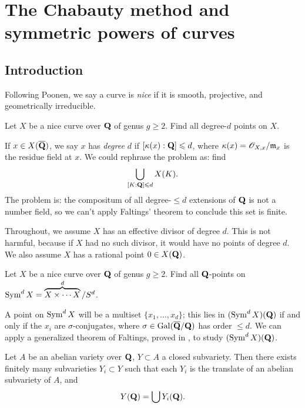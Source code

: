 
\section{The Chabauty method and symmetric powers of curves}\label{sec:park}





\subsection{Introduction}

Following Poonen, we say a curve is \emph{nice} if it is smooth, projective, 
and geometrically irreducible. 

\begin{question}
Let $X$ be a nice curve over $\mathbf{Q}$ of genus $g\geqslant 2$. Find all degree-$d$ 
points on $X$. 
\end{question}

If $x\in X(\overline{\mathbf{Q}})$, we say $x$ has \emph{degree $d$} if 
$[\kappa(x):\mathbf{Q}]\leqslant d$, where $\kappa(x)=\mathscr{O}_{X,x}/\mathfrak{m}_x$ is the residue 
field at $x$. We could rephrase the problem as: find 
\[
  \bigcup_{[K:\mathbf{Q}]\leqslant d} X(K) .
\]
The problem is: the compositum of all degree-$\leqslant d$ extensions of $\mathbf{Q}$ 
is not a number field, so we can't apply Faltings' theorem to conclude this set 
is finite. 

Throughout, we assume $X$ has an effective divisor of degree $d$. This is not 
harmful, because if $X$ had no such divisor, it would have no points of degree 
$d$. We also assume $X$ has a rational point $0\in X(\mathbf{Q})$. 

\begin{question}
Let $X$ be a nice curve over $\mathbf{Q}$ of genus $g\geqslant 2$. Find all 
$\mathbf{Q}$-points on $\operatorname{Sym}^d X = \overbrace{X\times \cdots X}^d / S^d$. 
\end{question}

A point on $\operatorname{Sym}^d X$ will be a multiset $\{x_1,\dots,x_d\}$; this lies 
in $(\operatorname{Sym}^d X)(\mathbf{Q})$ if and only if the $x_i$ are $\sigma$-conjugates, 
where $\sigma\in \operatorname{Gal}(\overline{\mathbf{Q}}/\mathbf{Q})$ has order $\leqslant d$. We can 
apply a generalized theorem of Faltings, proved in \cite{f94}, to study 
$(\operatorname{Sym}^d X)(\mathbf{Q})$. 

\begin{theo}[Faltings]
Let $A$ be an abelian variety over $\mathbf{Q}$, $Y\subset A$ a closed subvariety. Then 
there exists finitely many subvarieties $Y_i\subset Y$ such that each $Y_i$ is 
the translate of an abelian subvariety of $A$, and 
\[
  Y(\mathbf{Q}) = \bigcup Y_i(\mathbf{Q}) .
\]
\end{theo}

